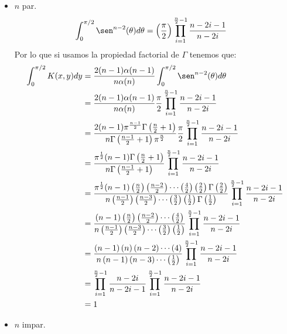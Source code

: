 \begin{homeworkProblem}
\begin{enumerate}
\begin{solucion}
\begin{itemize}
        \item $n$ par.\\
          \begin{align*}
            \int_{0}^{\pi/2}\sen^{n-2}(\theta)d\theta&=\left( \frac{\pi}{2}\right) \prod_{i=1}^{\frac{n}{2}-1} \frac{n-2i-1}{n-2i}
          \end{align*}
          Por lo que si usamos la propiedad factorial de $\Gamma$ tenemos que:
          \begin{align*}
            \int_{0}^{\pi/2}K(x,y)dy&=\frac{2(n-1)\alpha(n-1)}{n\alpha(n)}\int_{0}^{\pi/2}\sen^{n-2}(\theta)d\theta\\
            &=\frac{2(n-1)\alpha(n-1)}{n\alpha(n)}\frac{\pi}{2}\prod_{i=1}^{\frac{n}{2}-1}\frac{n-2i-1}{n-2i}\\
            &=\frac{2(n-1)\pi^{\frac{n-1}{2}}\Gamma\left( \frac{n}{2}+1 \right)}{n\Gamma\left( \frac{n-1}{2}+1 \right)\pi^{\frac{n}{2}}}\frac{\pi}{2}\prod_{i=1}^{\frac{n}{2}-1}\frac{n-2i-1}{n-2i}\\
            &=\frac{\pi^{\frac{1}{2}}(n-1)\Gamma\left( \frac{n}{2}+1 \right)}{n\Gamma\left( \frac{n-1}{2}+1 \right)}\prod_{i=1}^{\frac{n}{2}-1}\frac{n-2i-1}{n-2i}\\
            &=\frac{\pi^{\frac{1}{2}}(n-1)\left( \frac{n}{2} \right)\left( \frac{n-2}{2} \right)\cdots\left( \frac{4}{2} \right)\left( \frac{2}{2} \right)\Gamma\left( \frac{2}{2} \right)}{n\left( \frac{n-1}{2} \right)\left( \frac{n-3}{2} \right)\cdots\left( \frac{3}{2} \right)\left( \frac{1}{2} \right)\Gamma\left( \frac{1}{2} \right)}\prod_{i=1}^{\frac{n}{2}-1}\frac{n-2i-1}{n-2i}\\
            &=\frac{(n-1)\left( \frac{n}{2} \right)\left( \frac{n-2}{2} \right)\cdots\left( \frac{4}{2} \right)}{n\left( \frac{n-1}{2} \right)\left( \frac{n-3}{2} \right)\cdots\left( \frac{3}{2} \right)\left( \frac{1}{2} \right)}\prod_{i=1}^{\frac{n}{2}-1}\frac{n-2i-1}{n-2i}\\
            &=\frac{(n-1)\left( n \right)\left( n-2 \right)\cdots\left( 4 \right)}{n\left( n-1 \right)\left( n-3 \right)\cdots\left( \frac{1}{2} \right)}\prod_{i=1}^{\frac{n}{2}-1}\frac{n-2i-1}{n-2i}\\
            &=\prod_{i=1}^{\frac{n}{2}-1}\frac{n-2i}{n-2i-1}\prod_{i=1}^{\frac{n}{2}-1}\frac{n-2i-1}{n-2i}\\
            &=1
          \end{align*}
        \item $n$ impar.\\
          \begin{align*}

\end{align*}
\end{itemize}
\end{solucion}
\end{enumerate}
\end{homeworkProblem}
